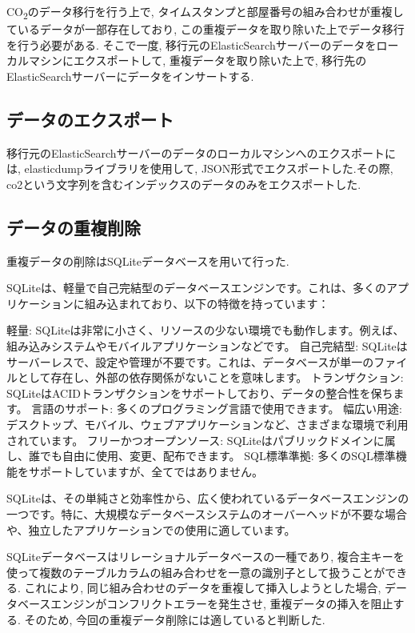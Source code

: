 CO\textsubscript{2}のデータ移行を行う上で, タイムスタンプと部屋番号の組み合わせが重複しているデータが一部存在しており, この重複データを取り除いた上でデータ移行を行う必要がある. そこで一度, 移行元のElasticSearchサーバーのデータをローカルマシンにエクスポートして, 重複データを取り除いた上で, 移行先のElasticSearchサーバーにデータをインサートする.

\subsection{データのエクスポート}
移行元のElasticSearchサーバーのデータのローカルマシンへのエクスポートには, elasticdumpライブラリを使用して, JSON形式でエクスポートした.その際, co2という文字列を含むインデックスのデータのみをエクスポートした.

\subsection{データの重複削除}
重複データの削除はSQLiteデータベースを用いて行った.

SQLiteは、軽量で自己完結型のデータベースエンジンです。これは、多くのアプリケーションに組み込まれており、以下の特徴を持っています：

軽量: SQLiteは非常に小さく、リソースの少ない環境でも動作します。例えば、組み込みシステムやモバイルアプリケーションなどです。
自己完結型: SQLiteはサーバーレスで、設定や管理が不要です。これは、データベースが単一のファイルとして存在し、外部の依存関係がないことを意味します。
トランザクション: SQLiteはACIDトランザクションをサポートしており、データの整合性を保ちます。
言語のサポート: 多くのプログラミング言語で使用できます。
幅広い用途: デスクトップ、モバイル、ウェブアプリケーションなど、さまざまな環境で利用されています。
フリーかつオープンソース: SQLiteはパブリックドメインに属し、誰でも自由に使用、変更、配布できます。
SQL標準準拠: 多くのSQL標準機能をサポートしていますが、全てではありません。

SQLiteは、その単純さと効率性から、広く使われているデータベースエンジンの一つです。特に、大規模なデータベースシステムのオーバーヘッドが不要な場合や、独立したアプリケーションでの使用に適しています。

SQLiteデータベースはリレーショナルデータベースの一種であり, 複合主キーを使って複数のテーブルカラムの組み合わせを一意の識別子として扱うことができる. これにより, 同じ組み合わせのデータを重複して挿入しようとした場合, データベースエンジンがコンフリクトエラーを発生させ, 重複データの挿入を阻止する. そのため, 今回の重複データ削除には適していると判断した.


